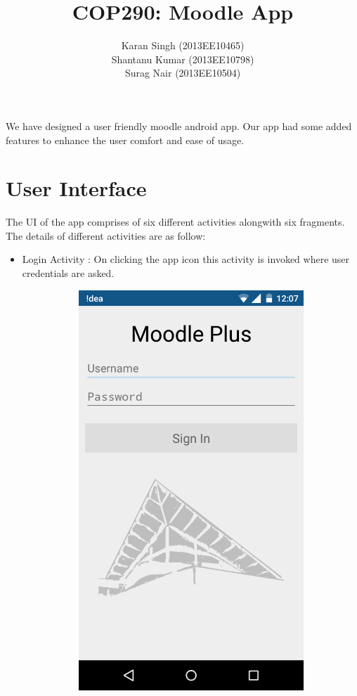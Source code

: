 \documentclass{article}
\title{COP290: Moodle App}
\author{Karan Singh (2013EE10465) \\ Shantanu Kumar (2013EE10798) \\ Surag Nair (2013EE10504) }
\begin{document}
\maketitle

We have designed a user friendly moodle android app. Our app had some added features to enhance the user comfort and ease of usage.

\section{User Interface}
The UI of the app comprises of six different activities alongwith six fragments. The details of different activities are as follow:\\

\begin{itemize}
\item Login Activity : On clicking the app icon this activity is invoked where user credentials are asked.\\
\begin{figure}[!h]
\centering
  \begin{subfigure}{.5\textwidth}
  \centering
  \includegraphics[width=0.8\linewidth]{pic1}

\end{subfigure}
\end{figure}
\end{itemize}
\end{document}
